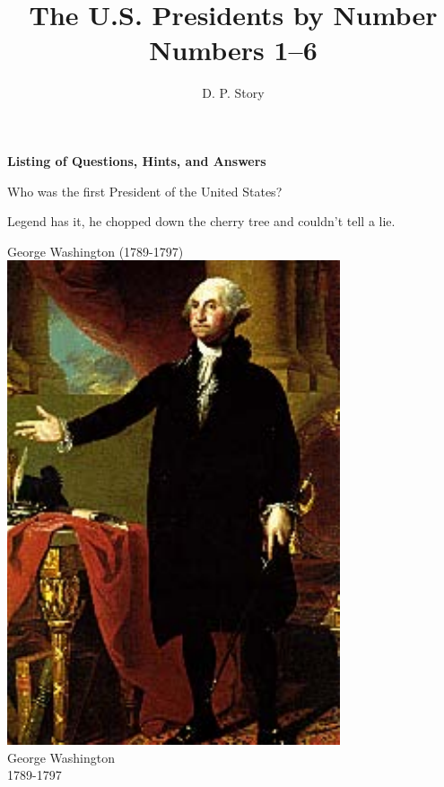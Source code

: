 \documentclass{article}
\author{D. P. Story}
\title{The U.S. Presidents by Number\texorpdfstring{\\}{,} Numbers 1--6}
\def\rescale{.4} %
\begin{document}
\maketitle

\ifecListing
    \begin{center}\Large\bfseries
        Listing of Questions, Hints, and Answers
    \end{center}\bigskip
\fi

\begin{card}
    Who was the first President of the United States?
    \begin{response}
        \begin{hint}
            Legend has it, he chopped down the cherry tree and couldn't tell a lie.
        \end{hint}
        \begin{answer}
        \ifecListing
            George Washington (1789-1797)
        \else\centering
            \includegraphics[scale=\rescale]{presidents/gw1}\\
                George Washington\\
                1789-1797
        \fi
        \end{answer}
    \end{response}
\end{card}
\end{document}
